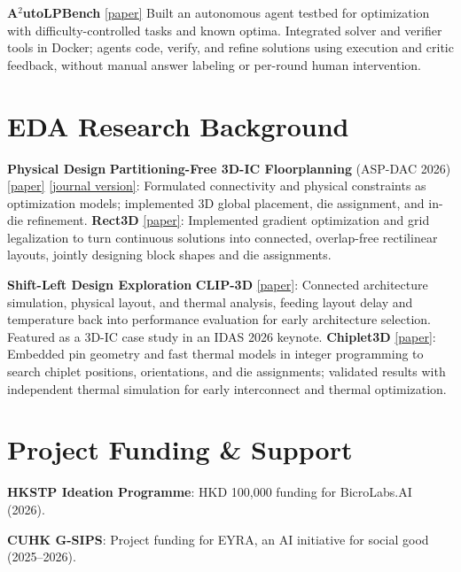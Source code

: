 \documentclass[11pt,a4paper]{article}
\begin{document}
\begin{minipage}[t]{\dimexpr0.715\textwidth-10pt\relax}
\vspace{0pt}
{\small \textbf{A$^{2}$utoLPBench} \href{https://arxiv.org/abs/2607.02141}{[paper]} Built an autonomous agent testbed for optimization with difficulty-controlled tasks and known optima. Integrated solver and verifier tools in Docker; agents code, verify, and refine solutions using execution and critic feedback, without manual answer labeling or per-round human intervention.\par}
\end{minipage}\par
\vspace{4pt}

\section*{EDA Research Background}
{\small
{\color{accent}\textbf{Physical Design}}\quad
\textbf{Partitioning-Free 3D-IC Floorplanning} (ASP-DAC 2026) \href{https://flians.github.io/pdf/3DFloorplan.pdf}{[paper]} \href{https://arxiv.org/abs/2609.13157}{[journal version]}: Formulated connectivity and physical constraints as optimization models; implemented 3D global placement, die assignment, and in-die refinement.
\textbf{Rect3D} \href{https://arxiv.org/abs/2609.18946}{[paper]}: Implemented gradient optimization and grid legalization to turn continuous solutions into connected, overlap-free rectilinear layouts, jointly designing block shapes and die assignments.\par
\vspace{3pt}
{\color{accent}\textbf{Shift-Left Design Exploration}}\quad
\textbf{CLIP-3D} \href{https://arxiv.org/abs/2607.12788}{[paper]}: Connected architecture simulation, physical layout, and thermal analysis, feeding layout delay and temperature back into performance evaluation for early architecture selection. Featured as a 3D-IC case study in an IDAS 2026 keynote.
\textbf{Chiplet3D} \href{https://arxiv.org/abs/2607.09742}{[paper]}: Embedded pin geometry and fast thermal models in integer programming to search chiplet positions, orientations, and die assignments; validated results with independent thermal simulation for early interconnect and thermal optimization.\par
}

\section*{Project Funding \& Support}
{\small
\textbf{HKSTP Ideation Programme}: HKD 100,000 funding for BicroLabs.AI (2026).\par
\textbf{CUHK G-SIPS}: Project funding for EYRA, an AI initiative for social good (2025--2026).\par
}
\end{document}
